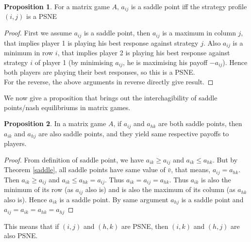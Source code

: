 \documentclass{article}
\theoremstyle{definition}
\newtheorem{prop}{Proposition}[section]
\begin{document}
\begin{prop}
For a matrix game $A$, $a_{ij}$ is a saddle point iff the strategy profile $(i,j)$ is a PSNE
\end{prop}
\begin{proof}
First we assume $a_{ij}$ is a saddle point, then $a_{ij}$ is a maximum in column $j$, that implies player 1 is playing his best response against strategy $j$. Also $a_{ij}$ is a minimum in row $i$, that implies player 2 is playing his best response against strategy $i$ of player 1 (by minimising $a_{ij}$, he is maximising his payoff $-a_{ij}$). Hence both players are playing their best responses, so this is a PSNE.\\
For the reverse, the above arguments in reverse directly give result. 
\end{proof}
We now give a proposition that brings out the interchagibility of saddle points/nash equilibriums in matrix games.
\begin{prop}
In a matrix game $A$, if $a_{ij}$ and $a_{hk}$ are both saddle points, then $a_{ik}$ and $a_{hj}$ are also saddle points, and they yield same respective payoffs to players.\\
\end{prop}
\begin{proof}
From definition of saddle point, we have $a_{ik}\geq a_{ij}$ and $a_{ik}\leq a_{hk}$. But by Theorem \ref{saddle}, all saddle points have same value of $\bar{v}$, that means, $a_{ij} = a_{hk}$. Then $a_{ik}\geq a_{ij}$ and $a_{ik}\leq a_{hk} = a_{ij}$. Thus $a_{ik} = a_{ij} = a_{hk}$. Thus $a_{ik}$ is also the minimum of its row (as $a_{ij}$ also is) and is also the maximum of its column (as $a_{hk}$ also is). Hence $a_{ik}$ is a saddle point. By same argument $a_{hj}$ is a saddle point and $a_{ij} = a_{ik} = a_{hk} = a_{hj}$  
\end{proof}
This means that if $(i,j)$ and $(h,k)$ are PSNE, then $(i,k)$ and $(h,j)$ are also PSNE.
\end{document}

